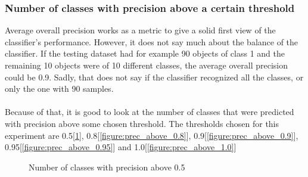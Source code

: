\documentclass[11pt]{article}
\begin{document}
      \subsubsection{Number of classes with precision above a certain threshold}
        Average overall precision works as a metric to give a solid first view of the classifier's performance. However, it does not say much about the balance of the classifier. If the testing dataset had for example 90 objects of class 1 and the remaining 10 objects were of 10 different classes, the average overall precision could be 0.9. Sadly, that does not say if the classifier recognized all the classes, or only the one with 90 samples.
        \\~\\
        Because of that, it is good to look at the number of classes that were predicted with precision above some chosen threshold. The thresholds chosen for this experiment are 0.5[\ref{figure:prec_above_0.5}], 0.8[\ref{figure:prec_above_0.8}], 0.9[\ref{figure:prec_above_0.9}], 0.95[\ref{figure:prec_above_0.95}] and 1.0[\ref{figure:prec_above_1.0}]
        \begin{figure}
          \centering
          \caption{Number of classes with precision above 0.5}
          \label{figure:prec_above_0.5}
        \end{figure}
\end{document}
